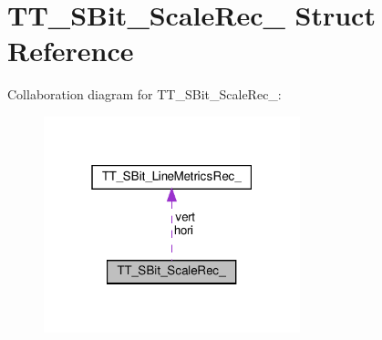 \hypertarget{structTT__SBit__ScaleRec__}{}\section{T\+T\+\_\+\+S\+Bit\+\_\+\+Scale\+Rec\+\_\+ Struct Reference}
\label{structTT__SBit__ScaleRec__}


Collaboration diagram for T\+T\+\_\+\+S\+Bit\+\_\+\+Scale\+Rec\+\_\+\+:
\nopagebreak
\begin{figure}[H]
\begin{center}
\leavevmode
\includegraphics[width=211pt]{structTT__SBit__ScaleRec____coll__graph}
\end{center}
\end{figure}
